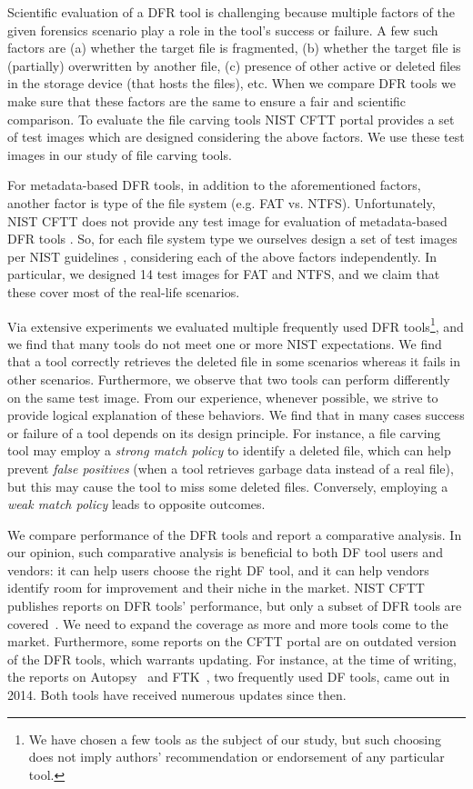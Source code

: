 Scientific evaluation of a DFR tool is challenging because multiple factors of the given forensics scenario play a role in the tool's success or failure.
A few such factors are (a) whether the target file is fragmented, (b) whether the target file is (partially) overwritten by another file, 
(c) presence of other active or deleted files in the storage device (that hosts the files), etc.
When we compare DFR tools we make sure that these factors are the same to ensure a fair and scientific comparison.
To evaluate the file carving tools NIST CFTT portal provides a set of test images which are designed considering the above factors.
We use these test images in our study of file carving tools. 

For metadata-based DFR tools, in addition to the aforementioned factors, another factor is type of the file system (e.g. FAT vs. NTFS). 
Unfortunately, NIST CFTT does not provide any test image for evaluation of metadata-based DFR tools \cite{meta:dfr:standards}.
So, for each file system type we ourselves design a set of test images per NIST guidelines \cite{meta:dfr:standards}, considering each of the above factors independently.
In particular, we designed 14 test images for FAT and NTFS, and we claim that these cover most of the real-life scenarios.


Via extensive experiments we evaluated multiple frequently used DFR tools\footnote{We have chosen a few tools as the subject of our study, 
but such choosing does not imply authors' recommendation or endorsement of any particular tool.}, and we find that many tools do not meet one or more NIST expectations.
We find that a tool correctly retrieves the deleted file in some scenarios whereas it fails in other scenarios. Furthermore, we observe that 
two tools can perform differently on the same test image. From our experience, whenever possible, 
we strive to provide logical explanation of these behaviors. We find that in many cases 
success or failure of a tool depends on its design principle. 
For instance, a file carving tool may employ a \emph{strong match policy} to identify a deleted file, which can help prevent \emph{false positives} (when a tool retrieves garbage data instead of a real file),
but this may cause the tool to miss some deleted files. Conversely, employing a \emph{weak match policy} leads to opposite outcomes. 
 
We compare performance of the DFR tools and report a comparative analysis. In our opinion, such comparative analysis is beneficial to both DF tool 
users and vendors: it can help users choose the right DF tool, and it can help vendors identify room for improvement and their niche in the market. 
NIST CFTT publishes reports on DFR tools' performance, but only a subset of DFR tools are covered~\cite{cftt_meta_reports,cftt_carving_reports}. 
We need to expand the coverage as more and more tools come to the market.
Furthermore, some reports on the CFTT portal are on outdated version of the DFR tools, which warrants updating. 
For instance, at the time of writing, the reports on Autopsy~\cite{dhs:autopsy} and FTK~\cite{dhs:ftk}, two frequently used DF tools, came out in 2014. 
Both tools have received numerous updates since then.   

